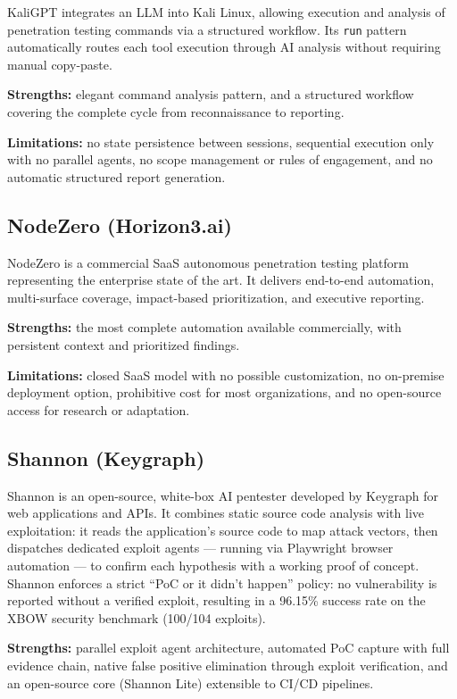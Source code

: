 \documentclass[12pt,a4paper]{report}
\begin{document}
KaliGPT integrates an LLM into Kali Linux, allowing execution and analysis of
penetration testing commands via a structured workflow. Its \texttt{run} pattern
automatically routes each tool execution through AI analysis without requiring
manual copy-paste.

\textbf{Strengths:} elegant command analysis pattern, and a structured workflow
covering the complete cycle from reconnaissance to reporting.

\textbf{Limitations:} no state persistence between sessions, sequential execution
only with no parallel agents, no scope management or rules of engagement, and no
automatic structured report generation.

\subsection{NodeZero (Horizon3.ai)}

NodeZero is a commercial SaaS autonomous penetration testing platform representing
the enterprise state of the art. It delivers end-to-end automation, multi-surface
coverage, impact-based prioritization, and executive reporting.

\textbf{Strengths:} the most complete automation available commercially, with
persistent context and prioritized findings.

\textbf{Limitations:} closed SaaS model with no possible customization, no
on-premise deployment option, prohibitive cost for most organizations, and no
open-source access for research or adaptation.

\subsection{Shannon (Keygraph)}

Shannon is an open-source, white-box AI pentester developed by Keygraph for
web applications and APIs. It combines static source code analysis with live
exploitation: it reads the application's source code to map attack vectors, then
dispatches dedicated exploit agents --- running via Playwright browser automation
--- to confirm each hypothesis with a working proof of concept. Shannon enforces
a strict ``PoC or it didn't happen'' policy: no vulnerability is reported without
a verified exploit, resulting in a 96.15\% success rate on the XBOW security
benchmark (100/104 exploits).

\textbf{Strengths:} parallel exploit agent architecture, automated PoC capture with
full evidence chain, native false positive elimination through exploit verification,
and an open-source core (Shannon Lite) extensible to CI/CD pipelines.
\end{document}
